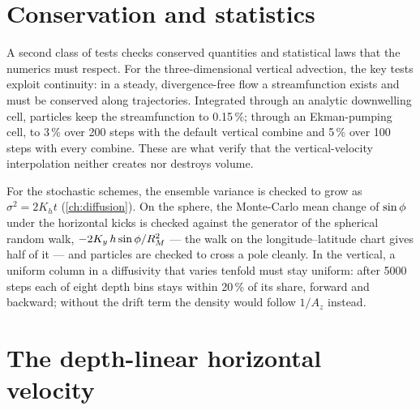 \section{Conservation and statistics}\label{sec:val-conservation}

A second class of tests checks conserved quantities and statistical laws that the numerics must respect.
For the three-dimensional vertical advection, the key tests exploit continuity: in a steady, divergence-free
flow a streamfunction exists and must be conserved along trajectories. Integrated through an analytic
downwelling cell, particles keep the streamfunction to 0.15\,\%; through an Ekman-pumping cell, to 3\,\% over
200 steps with the default vertical combine and 5\,\% over 100 steps with every combine. These are what verify
that the vertical-velocity interpolation neither creates nor destroys volume.

For the stochastic schemes, the ensemble variance is checked to grow as $\sigma^2=2K_h t$
(\cref{ch:diffusion}). On the sphere, the Monte-Carlo mean change of $\sin\phi$ under the horizontal kicks is
checked against the generator of the spherical random walk, $-2K_y\,h\sin\phi/R_M^2$ --- the walk on the
longitude--latitude chart gives half of it --- and particles are checked to cross a pole cleanly. In the
vertical, a uniform column in a diffusivity that varies tenfold must stay uniform: after \num{5000} steps each
of eight depth bins stays within 20\,\% of its share, forward and backward; without the drift term the density
would follow $1/A_z$ instead.

\section{The depth-linear horizontal velocity}\label{sec:val-depth-linear}

